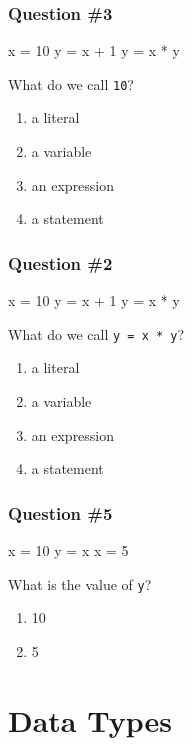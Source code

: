 \documentclass[11pt]{beamer}
\begin{document}
\begin{frame}[fragile]
  \frametitle{Question \#3}
  \Enlarge

  \begin{semiverbatim}
x = 10
y = x + 1
y = x * y
  \end{semiverbatim}
  What do we call \texttt{10}?
  \begin{enumerate}[label=\Alph*]
  \item  a literal
  \item  a variable
  \item  an expression
  \item  a statement
  \end{enumerate}
\end{frame}

\begin{frame}[fragile]
  \frametitle{Question \#2}
  \Enlarge

  \begin{semiverbatim}
x = 10
y = x + 1
y = x * y
  \end{semiverbatim}
  What do we call \texttt{y = x * y}?
  \begin{enumerate}[label=\Alph*]
  \item  a literal
  \item  a variable
  \item  an expression
  \item  a statement
  \end{enumerate}
\end{frame}

\begin{frame}[fragile]
  \frametitle{Question \#5}
  \Enlarge

  \begin{semiverbatim}
x = 10
y = x
x = 5
  \end{semiverbatim}
  What is the value of \texttt{y}?
  \begin{enumerate}[label=\Alph*]
  \item  10
  \item  5
  \end{enumerate}
\end{frame}

\section{Data Types}
\end{document}
